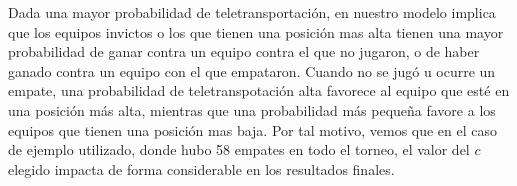 Dada una mayor probabilidad de teletransportación, en nuestro modelo implica que los equipos invictos o los que tienen una posición mas alta tienen una mayor probabilidad de ganar contra un equipo contra el que no jugaron, o de haber ganado contra un equipo con el que empataron. Cuando no se jugó u ocurre un empate, una probabilidad de teletranspotación alta favorece al equipo que esté en una posición más alta, mientras que una probabilidad más pequeña favore a los equipos que tienen una posición mas baja. Por tal motivo, vemos que en el caso de ejemplo utilizado, donde hubo 58 empates en todo el torneo, el valor del $c$ elegido impacta de forma considerable en los resultados finales.
